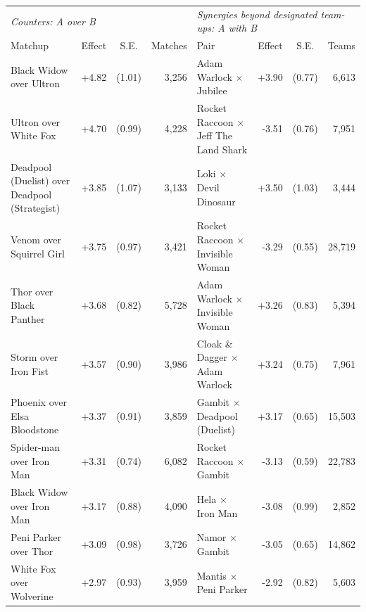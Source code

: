 \documentclass[11pt]{article}
\newcommand{\sym}[1]{\rlap{$^{#1}$}}
\renewcommand{\arraystretch}{1.05}
\begin{document}
\begin{landscape}
\begin{center}
{\footnotesize\setlength{\tabcolsep}{5pt}\renewcommand{\arraystretch}{1.0}
\label{tab:pairwise}
\begin{tabular}{l r r r @{\hspace{2.5em}} l r r r}
\toprule
\multicolumn{4}{l}{\emph{Counters: A over B}} & \multicolumn{4}{l}{\emph{Synergies beyond designated team-ups: A with B}} \\
Matchup & \multicolumn{1}{c}{Effect} & \multicolumn{1}{c}{S.E.} & \multicolumn{1}{c}{Matches} &
Pair & \multicolumn{1}{c}{Effect} & \multicolumn{1}{c}{S.E.} & \multicolumn{1}{c}{Teams} \\
\midrule
Black Widow over Ultron & +4.82\sym{***} & (1.01) & 3,256 & Adam Warlock $\times$ Jubilee & +3.90\sym{***} & (0.77) & 6,613 \\
Ultron over White Fox & +4.70\sym{***} & (0.99) & 4,228 & Rocket Raccoon $\times$ Jeff The Land Shark & -3.51\sym{***} & (0.76) & 7,951 \\
Deadpool (Duelist) over Deadpool (Strategist) & +3.85\sym{**} & (1.07) & 3,133 & Loki $\times$ Devil Dinosaur & +3.50\sym{**} & (1.03) & 3,444 \\
Venom over Squirrel Girl & +3.75\sym{***} & (0.97) & 3,421 & Rocket Raccoon $\times$ Invisible Woman & -3.29\sym{***} & (0.55) & 28,719 \\
Thor over Black Panther & +3.68\sym{***} & (0.82) & 5,728 & Adam Warlock $\times$ Invisible Woman & +3.26\sym{***} & (0.83) & 5,394 \\
Storm over Iron Fist & +3.57\sym{***} & (0.90) & 3,986 & Cloak \& Dagger $\times$ Adam Warlock & +3.24\sym{***} & (0.75) & 7,961 \\
Phoenix over Elsa Bloodstone & +3.37\sym{***} & (0.91) & 3,859 & Gambit $\times$ Deadpool (Duelist) & +3.17\sym{***} & (0.65) & 15,503 \\
Spider-man over Iron Man & +3.31\sym{***} & (0.74) & 6,082 & Rocket Raccoon $\times$ Gambit & -3.13\sym{***} & (0.59) & 22,783 \\
Black Widow over Iron Man & +3.17\sym{**} & (0.88) & 4,090 & Hela $\times$ Iron Man & -3.08\sym{**} & (0.99) & 2,852 \\
Peni Parker over Thor & +3.09\sym{**} & (0.98) & 3,726 & Namor $\times$ Gambit & -3.05\sym{***} & (0.65) & 14,862 \\
White Fox over Wolverine & +2.97\sym{**} & (0.93) & 3,959 & Mantis $\times$ Peni Parker & -2.92\sym{**} & (0.82) & 5,603 \\

\end{tabular}}
\end{center}
\end{landscape}
\end{document}
